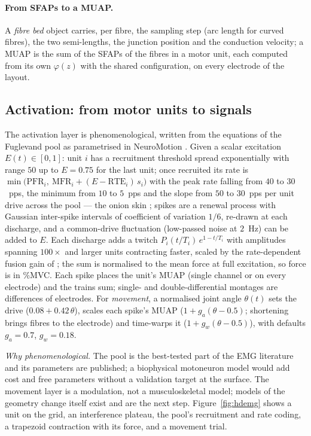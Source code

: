 \documentclass[11pt,a4paper]{article}
\begin{document}
\paragraph{From SFAPs to a MUAP.} A \emph{fibre bed} object carries, per fibre, the
sampling step (arc length for curved fibres), the two semi-lengths, the junction position
and the conduction velocity; a MUAP is the sum of the SFAPs of the fibres in a motor
unit, each computed from its own $\varphi(z)$ with the shared configuration, on every
electrode of the layout.

\subsection{Activation: from motor units to signals}
\label{sec:activation}
The activation layer is phenomenological, written from the equations of the Fuglevand
pool as parametrised in NeuroMotion \citep{fuglevand1993models, ma2024neuromotion}. Given
a scalar excitation $E(t)\in[0,1]$: unit $i$ has a recruitment threshold spread
exponentially with range $50$ up to $E=0.75$ for the last unit; once recruited its rate is
$\min\big(\mathrm{PFR}_i,\ \mathrm{MFR}_i + (E-\mathrm{RTE}_i)\,s_i\big)$ with the peak
rate falling from $40$ to $30$~pps, the minimum from $10$ to $5$~pps and the slope from
$50$ to $30$~pps per unit drive across the pool --- the onion skin
\citep{deluca2010relationship}; spikes are a renewal process with Gaussian inter-spike
intervals of coefficient of variation $1/6$, re-drawn at each discharge, and a common-drive
fluctuation (low-passed noise at $2$~Hz) can be added to $E$. Each discharge adds a
twitch $P_i (t/T_i)\,e^{1-t/T_i}$ with amplitudes spanning $100\times$ and larger units
contracting faster, scaled by the rate-dependent fusion gain of
\citet{fuglevand1993models}; the sum is normalised to the mean force at full excitation,
so force is in \%MVC. Each spike places the unit's MUAP (single channel or on every
electrode) and the trains sum; single- and double-differential montages are differences
of electrodes. For \emph{movement}, a normalised joint angle $\theta(t)$ sets the drive
($0.08 + 0.42\,\theta$), scales each spike's MUAP ($1 + g_a(\theta-0.5)$; shortening brings
fibres to the electrode) and time-warps it ($1 + g_w(\theta-0.5)$), with defaults
$g_a = 0.7$, $g_w = 0.18$.

\emph{Why phenomenological.} The pool is the best-tested part of the EMG literature and
its parameters are published; a biophysical motoneuron model would add cost and free
parameters without a validation target at the surface. The movement layer is a modulation,
not a musculoskeletal model; models of the geometry change itself exist
\citep{mesin2006finite, mesin2011insights} and are the next step. Figure~\ref{fig:hdemg}
shows a unit on the grid, an interference plateau, the pool's recruitment and rate coding,
a trapezoid contraction with its force, and a movement trial.
\end{document}
